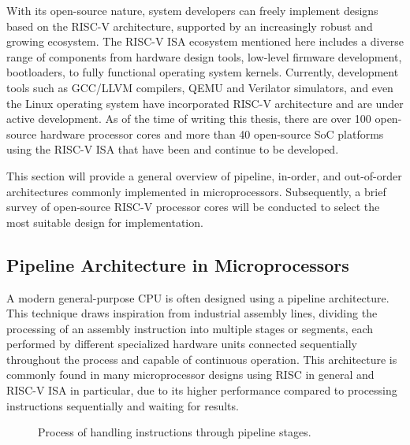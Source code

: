 With its open-source nature, system developers can freely implement designs based on the RISC-V architecture, supported by an increasingly robust and growing ecosystem. The RISC-V ISA ecosystem mentioned here includes a diverse range of components from hardware design tools, low-level firmware development, bootloaders, to fully functional operating system kernels. Currently, development tools such as GCC/LLVM compilers, QEMU and Verilator simulators, and even the Linux operating system have incorporated RISC-V architecture and are under active development. As of the time of writing this thesis, there are over 100 open-source hardware processor cores and more than 40 open-source SoC platforms using the RISC-V ISA that have been and continue to be developed.

This section will provide a general overview of pipeline, in-order, and out-of-order architectures commonly implemented in microprocessors. Subsequently, a brief survey of open-source RISC-V processor cores will be conducted to select the most suitable design for implementation.

\subsection{Pipeline Architecture in Microprocessors}

A modern general-purpose CPU is often designed using a pipeline architecture. This technique draws inspiration from industrial assembly lines, dividing the processing of an assembly instruction into multiple stages or segments, each performed by different specialized hardware units connected sequentially throughout the process and capable of continuous operation. This architecture is commonly found in many microprocessor designs using RISC in general and RISC-V ISA in particular, due to its higher performance compared to processing instructions sequentially and waiting for results.

\begin{figure}[h!]
    \centering
    \caption{Process of handling instructions through pipeline stages.}
    \label{fig:pipeline_stages}
\end{figure}

